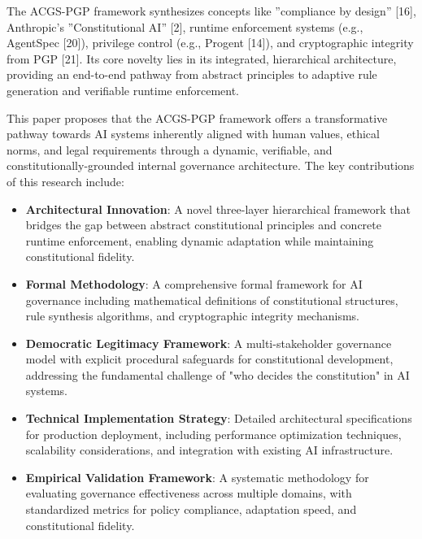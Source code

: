 \documentclass[sigconf,review,anonymous=false]{acmart} %
\begin{document}
The ACGS-PGP framework synthesizes concepts like ''compliance by design'' [16], Anthropic's ''Constitutional AI'' [2], runtime enforcement systems (e.g., AgentSpec [20]), privilege control (e.g., Progent [14]), and cryptographic integrity from PGP [21]. Its core novelty lies in its integrated, hierarchical architecture, providing an end-to-end pathway from abstract principles to adaptive rule generation and verifiable runtime enforcement.

This paper proposes that the ACGS-PGP framework offers a transformative pathway towards AI systems inherently aligned with human values, ethical norms, and legal requirements through a dynamic, verifiable, and constitutionally-grounded internal governance architecture. The key contributions of this research include:

\begin{itemize}
    \item \textbf{Architectural Innovation}: A novel three-layer hierarchical framework that bridges the gap between abstract constitutional principles and concrete runtime enforcement, enabling dynamic adaptation while maintaining constitutional fidelity.
    \item \textbf{Formal Methodology}: A comprehensive formal framework for AI governance including mathematical definitions of constitutional structures, rule synthesis algorithms, and cryptographic integrity mechanisms.
    \item \textbf{Democratic Legitimacy Framework}: A multi-stakeholder governance model with explicit procedural safeguards for constitutional development, addressing the fundamental challenge of "who decides the constitution" in AI systems.
    \item \textbf{Technical Implementation Strategy}: Detailed architectural specifications for production deployment, including performance optimization techniques, scalability considerations, and integration with existing AI infrastructure.
    \item \textbf{Empirical Validation Framework}: A systematic methodology for evaluating governance effectiveness across multiple domains, with standardized metrics for policy compliance, adaptation speed, and constitutional fidelity.
\end{itemize}
\end{document}
